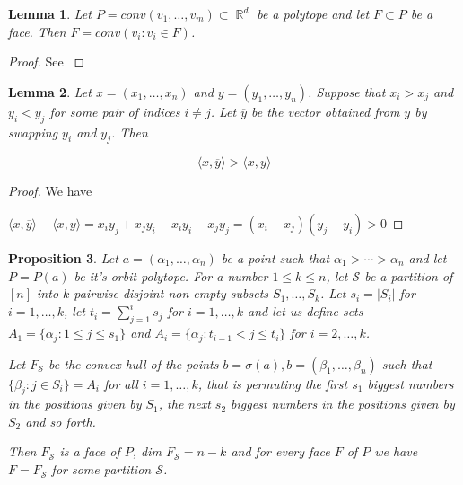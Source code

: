 \documentclass[12pt]{amsart}
\newtheorem{lemma}{Lemma}[section]
\newtheorem{propo}[lemma]{Proposition}
\numberwithin{equation}{section}
\newcommand{\RR}{\operatorname{\mathbb{R}}}
\begin{document}
\begin{lemma}
\label{lem:faces}
Let $P=conv(v_1,\dots,v_m)\subset \RR^d$ be a polytope and let $F\subset P$ be a face. Then $F=conv(v_i: v_i\in F)$.
\end{lemma}

\begin{proof}
See \cite{Barvinok}
\end{proof}

\begin{lemma}
\label{lem:reorder}
Let $x=(x_1,\dots, x_n)$ and $y=(y_1,\dots, y_n)$. Suppose that $x_i>x_j$ and $y_i<y_j$ for some pair of indices $i\neq j$. Let $\overline{y}$ be the vector obtained from $y$ by swapping $y_i$ and $y_j$. Then

$$ \langle x,\overline y \rangle > \langle x,y \rangle$$
\end{lemma}

\begin{proof} We have

$\langle x,\overline y \rangle - \langle x,y \rangle=x_iy_j+x_jy_i-x_iy_i-x_jy_j=(x_i-x_j)(y_j-y_i)>0$
\end{proof}

\begin{propo}
\label{propo:permfaces}
Let $a=(\alpha_1,\dots, \alpha_n)$ be a point such that $\alpha_1>\cdots > \alpha_n$ and let $P=P(a)$ be it's orbit polytope. For a number $1\leq k\leq n$, let $\mathcal S$ be a partition of $[n]$ into $k$ pairwise disjoint non-empty subsets $S_1,\dots, S_k$. Let $s_i=|S_i|$ for $i=1,\dots,k$, let $t_i=\sum_{j=1}^i s_j$ for $i=1,\dots,k$ and let us define sets $A_1=\{\alpha_j: 1\leq j\leq s_1\}$ and $A_i=\{\alpha_j: t_{i-1}<j\leq t_i\}$ for $i=2,\dots,k$.

Let $F_{\mathcal S}$ be the convex hull of the points $b=\sigma(a), b=(\beta_1,\dots,\beta_n)$ such that $\{ \beta_j:j\in S_i \}=A_i $ for all $i=1,\dots,k$, that is permuting the first $s_1$ biggest numbers in the positions given by $S_1$, the next $s_2$ biggest numbers in the positions given by $S_2$ and so forth.

Then $F_{\mathcal S}$ is a face of $P$, dim $F_{\mathcal S}=n-k$ and for every face $F$ of $P$ we have $F=F_{\mathcal S}$ for some partition $\mathcal S$.
\end{propo}
\end{document}

